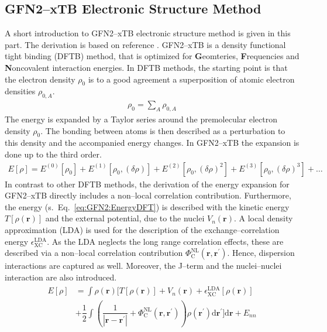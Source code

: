 	\subsection{\mbox{GFN2--xTB} Electronic Structure Method}
	A short introduction to GFN2--xTB electronic structure method is given in this part.
	The derivation is based on reference \cite{Bannwarth2019_GFN2xTB}.
	\mbox{GFN2--xTB} is a density functional tight binding (DFTB) method,
	that is optimized for \textbf{G}eomteries,
	\textbf{F}requencies and \textbf{N}oncovalent interaction energies.
	In DFTB methods, the starting point is that the electron density $\rho_0$ is to a good agreement a superposition of atomic electron densities $\rho_{0,A}$.
	\begin{align}
		\label{eq:GFN2:Rho0}
		\rho_0 = \sum_A \rho_{0,A}
	\end{align}
	The energy is expanded by a Taylor series around the premolecular electron density $\rho_0$.
	The bonding between atoms is then described as a perturbation to this density and the accompanied energy changes.
	In \mbox{GFN2--xTB} the expansion is done up to the third order. 
	\begin{align}
		\label{eq:GFN2:EnergyPerturbation}
		E[\rho] = E^{(0)}[\rho_0] + E^{(1)}[\rho_0,(\delta \rho)]
		 + E^{(2)}[\rho_0,(\delta \rho)^2]+ E^{(3)}[\rho_0,(\delta \rho)^3] + \dots
	\end{align}
	In contrast to other DFTB methods, the derivation of the energy expansion for GFN2--xTB directly includes a non--local correlation contribution.
	Furthermore, the energy (s.~Eq.~\eqref{eq:GFN2:EnergyDFT}) is described with the kinetic energy $T[\rho(\textbf{r})]$ and
	the external potential, due to the nuclei $V_n(\textbf{r})$.
	A local density approximation (LDA) is used for the description of the exchange--correlation energy $\epsilon^\mathrm{LDA}_\mathrm{XC}$.
	As the LDA neglects the long range correlation effects,
	these are described via a non--local correlation contribution $\Phi^\mathrm{NL}_\mathrm{C}\left(\textbf{r},\textbf{r}^\prime\right)$.
	Hence, dispersion interactions are captured as well.
	Moreover, the J--term and the nuclei--nuclei interaction are also introduced.
	\begin{align}
		\label{eq:GFN2:EnergyDFT}
		\begin{split}
		E[\rho] &= \int \rho(\textbf{r})\bigg[ T[\rho(\textbf{r})]
		 + V_n(\textbf{r}) 
		 + \epsilon^\mathrm{LDA}_\mathrm{XC}[\rho(\textbf{r})] \\
		 &+ \dfrac{1}{2} \int \left( \dfrac{1}{|\textbf{r}-\textbf{r}^\prime|} 
		 + \Phi^\mathrm{NL}_\mathrm{C}\left(\textbf{r},\textbf{r}^\prime\right)\right)
		 \rho\left(\textbf{r}^\prime\right)\mathrm{d}\textbf{r}^\prime \bigg] \mathrm{d}\textbf{r} + E_{nn}
		\end{split}
	\end{align}
